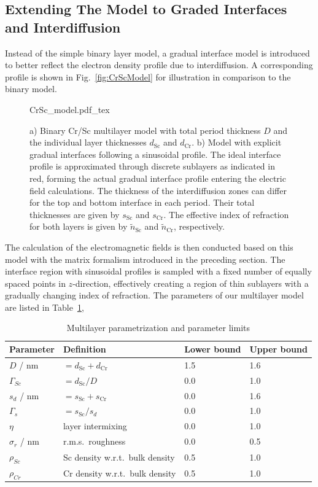\subsection{Extending The Model to Graded Interfaces and Interdiffusion}
Instead of the simple binary layer model, a gradual interface model is 
introduced to better reflect the electron density profile due to 
interdiffusion. A corresponding profile is shown in Fig.~\ref{fig:CrScModel} 
for illustration in comparison to the binary model.
\begin{figure}[htb]
    \def\svgwidth{\textwidth}
    {CrSc_model.pdf_tex}
    \caption[Binary and gradual Cr/Sc multilayer models.]{a) Binary Cr/Sc multilayer model with total period thickness $D$ and 
the individual layer thicknesses $d_\text{Sc}$ and $d_\text{Cr}$. b) Model with 
explicit gradual interfaces following a sinusoidal profile. The ideal interface 
profile is approximated through discrete sublayers as indicated in red, forming 
the actual gradual interface profile entering the electric field calculations. 
The thickness of the interdiffusion zones can differ for the top and bottom 
interface in each period. Their total thicknesses are given by $s_\text{Sc}$ 
and $s_\text{Cr}$. The effective index of refraction for both layers is given 
by $\tilde{n}_\text{Sc}$ and $\tilde{n}_\text{Cr}$, respectively.}
    \label{ch_spec:fig_CrScModel}
\end{figure}
The calculation of the electromagnetic fields is then conducted based on this 
model with the matrix formalism introduced in the preceding section. The 
interface region with sinusoidal profiles is sampled with a fixed number of 
equally spaced points in $z$-direction, effectively creating a region of thin 
sublayers with a gradually changing index of refraction. The parameters of our 
multilayer model are listed in Table~\ref{tbl:parametrization},
\begin{table}
\centering
\caption{Multilayer parametrization and parameter limits}
\label{tbl:parametrization}
\begin{tabular}{@{}llll@{}}
\toprule
Parameter & Definition & Lower bound & Upper bound\\ \midrule
$D$ / nm & $= d_\text{Sc} + d_\text{Cr}$ & 1.5&1.6 \\ 
$\Gamma_{Sc}$ & $= d_\text{Sc} / D$&0.0 &1.0 \\ 
$s_d$ / nm&$=s_\text{Sc} + s_\text{Cr}$&0.0 & 1.6\\ 
$\Gamma_s$ &$= s_\text{Sc} / s_d$& 0.0& 1.0\\ 
$\eta$ &layer intermixing& 0.0& 1.0\\ 
$\sigma_r$ / nm & r.m.s.~roughness& 0.0& 0.5\\ 
$\rho_{Sc}$ &Sc density w.r.t.~bulk density & 0.5& 1.0\\ 
$\rho_{Cr}$ &Cr density w.r.t.~bulk density& 0.5& 1.0\\ 
 \bottomrule
\end{tabular}
\end{table}
